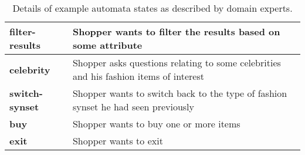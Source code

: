 \documentclass[10pt,a4paper]{article}
\begin{document}
\begin{table}[t]
{\begin{center}
\begin{tabular}{|p{5.8cm}|p{15.2cm}|}
\textbf{filter-results} & Shopper wants to filter the results based on some attribute\\ \hline
\textbf{celebrity} & Shopper asks questions relating to some celebrities and his fashion items of interest\\ \hline
\textbf{switch-synset} & Shopper wants to switch back to the type of fashion synset he had seen previously\\ \hline
\textbf{buy} & Shopper wants to buy one or more items\\ \hline
\textbf{exit} & Shopper wants to exit \\ \hline
\end{tabular}
\end{center}
}
\caption{Details of example automata states as described by domain experts.}
\label{tab:automata_states}
\end{table}
\end{document}
